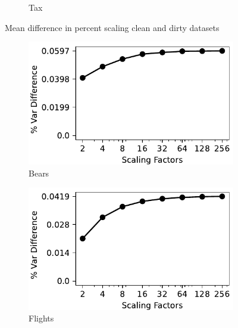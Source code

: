 \begin{figure}[!t]
\begin{subfigure}{0.32\textwidth}
    \caption{Tax}
    \label{exp:mean_tax}
\end{subfigure}
\hfill
\caption{Mean difference in percent scaling clean and dirty datasets}
\label{exp:mean_difference_datasets}
\end{figure}


\begin{figure}[!t]
    \centering 
    \centering
\begin{subfigure}{0.32\textwidth}
    \includegraphics[width=\textwidth]{figures/plot/var/variance_diff_beers.pdf}
    \caption{Bears}
    \label{exp:var_bears}
\end{subfigure}
\hfill
\begin{subfigure}{0.32\textwidth}
    \includegraphics[width=\textwidth]{figures/plot/var/variance_diff_flights.pdf}
    \caption{Flights}
    \label{exp:var_flights}
\end{subfigure}
\hfill
\begin{subfigure}{0.32\textwidth}

\end{subfigure}
\end{figure}
